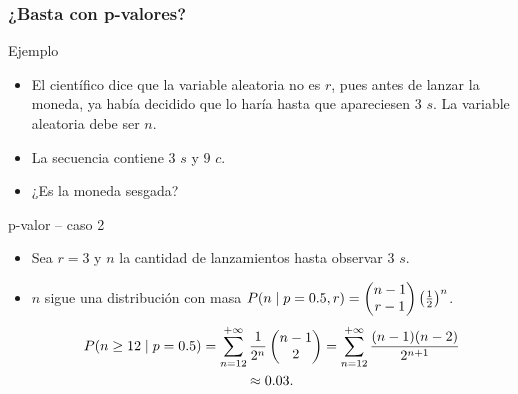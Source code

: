 \documentclass[table]{beamer}
\begin{document}
\begin{frame}
    \frametitle{¿Basta con p-valores?}
    \begin{exampleblock}{Ejemplo}
        \begin{itemize}
            \item El científico dice que la variable aleatoria no es $r$, pues antes de lanzar la moneda, ya había decidido que lo haría hasta que apareciesen $3$ $s$. La variable aleatoria debe ser $n$.
            \item La secuencia contiene $3$ $s$ y $9$ $c$.
            \item ¿Es la moneda sesgada?
        \end{itemize}
    \end{exampleblock}
    \begin{block}{p-valor -- caso 2}
        \begin{itemize}
            \item Sea $r = 3$ y $n$ la cantidad de lanzamientos hasta observar $3$ $s$.
            \item $n$ sigue una distribución con masa $\prob{n \mid p = 0.5 , r} = \combin{n - 1}{r - 1} \parens{\frac{1}{2}}^{n}$.
                \begin{multline*}
                    \prob{n \geq 12 \mid p = 0.5} = \sum_{n = 12}^{+ \infty} \frac{1}{2^{n}} \combin{n - 1}{2}
                    = \sum_{n = 12}^{+ \infty} \frac{\parens{n - 1} \parens{n - 2}}{2^{n + 1}}
                    \\
                    \approx 0.03 .
                \end{multline*}
        \end{itemize}
    \end{block}
\end{frame}
\end{document}
